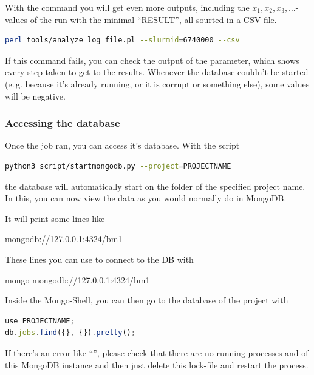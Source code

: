 \documentclass[]{scrartcl}
\begin{document}
With the command  you will get even more outputs, including the $x_1, x_2, x_3, \dots$-values of the 
run with the minimal ``RESULT'', all sourted in a CSV-file.

\begin{lstlisting}[language=bash]
perl tools/analyze_log_file.pl --slurmid=6740000 --csv
\end{lstlisting}


If this command fails, you can check the output of the  parameter, which shows every step taken to get to
the results. Whenever the database couldn't be started (e.\,g. because it's already running, or it is corrupt or something
else), some values will be negative.

\subsubsection{Accessing the database}

Once the job ran, you can access it's database. With the script

\begin{lstlisting}[language=bash]
python3 script/startmongodb.py --project=PROJECTNAME
\end{lstlisting}

the database will automatically start on the folder of the specified project name. In this, you can now view the data
as you would normally do in MongoDB.

It will print some lines like

\begin{cverbatim}
mongodb://127.0.0.1:4324/bm1
\end{cverbatim}

These lines you can use to connect to the DB with

\begin{cverbatim}
mongo mongodb://127.0.0.1:4324/bm1
\end{cverbatim}

Inside the Mongo-Shell, you can then go to the database of the project with 
\begin{lstlisting}[language=JavaScript]
use PROJECTNAME;
db.jobs.find({}, {}).pretty();
\end{lstlisting}

If there's an error like ``'',
please check that there are no running processes and of this MongoDB instance and then just delete this lock-file and restart the process.
\end{document}

